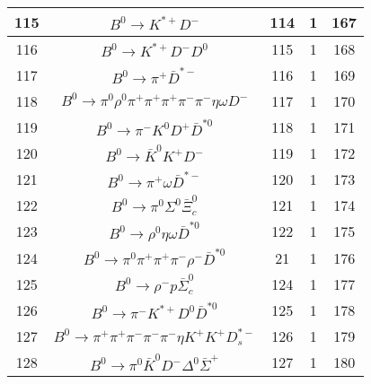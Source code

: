 \documentclass[landscape]{article}
\begin{document}
\begin{table}[htbp!]
\begin{tabular}{|c|c|c|c|c|}
\hline
115 & $ B^{0} \rightarrow K^{*+} D^{-} $ & 114 & 1 & 167 \\
\hline
116 & $ B^{0} \rightarrow K^{*+} D^{-} D^{0} $ & 115 & 1 & 168 \\
\hline
117 & $ B^{0} \rightarrow \pi^{+} \bar{D}^{*-} $ & 116 & 1 & 169 \\
\hline
118 & $ B^{0} \rightarrow \pi^{0} \rho^{0} \pi^{+} \pi^{+} \pi^{+} \pi^{-} \pi^{-} \eta \omega D^{-} $ & 117 & 1 & 170 \\
\hline
119 & $ B^{0} \rightarrow \pi^{-} K^{0} D^{+} \bar{D}^{*0} $ & 118 & 1 & 171 \\
\hline
120 & $ B^{0} \rightarrow \bar{K}^{0} K^{+} D^{-} $ & 119 & 1 & 172 \\
\hline
121 & $ B^{0} \rightarrow \pi^{+} \omega \bar{D}^{*-} $ & 120 & 1 & 173 \\
\hline
122 & $ B^{0} \rightarrow \pi^{0} \Sigma^{0} \bar{\Xi}_{c}^{0} $ & 121 & 1 & 174 \\
\hline
123 & $ B^{0} \rightarrow \rho^{0} \eta \omega \bar{D}^{*0} $ & 122 & 1 & 175 \\
\hline
124 & $ B^{0} \rightarrow \pi^{0} \pi^{+} \pi^{+} \pi^{-} \rho^{-} \bar{D}^{*0} $ & 21 & 1 & 176 \\
\hline
125 & $ B^{0} \rightarrow \rho^{-} p \bar{\Sigma}_{c}^{0} $ & 124 & 1 & 177 \\
\hline
126 & $ B^{0} \rightarrow \pi^{-} K^{*+} D^{0} \bar{D}^{*0} $ & 125 & 1 & 178 \\
\hline
127 & $ B^{0} \rightarrow \pi^{+} \pi^{+} \pi^{-} \pi^{-} \pi^{-} \eta K^{+} K^{+} D_{s}^{*-} $ & 126 & 1 & 179 \\
\hline
128 & $ B^{0} \rightarrow \pi^{0} \bar{K}^{0} D^{-} \Delta^{0} \bar{\Sigma}^{+} $ & 127 & 1 & 180 \\
\hline
\end{tabular}
\end{table}

\clearpage
\end{document}
